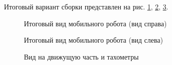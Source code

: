 \documentclass[14pt,a4paper,russian]{scrartcl}
\begin{document}
Итоговый вариант сборки представлен на рис. \ref{fig:robocar_common_sight_right},
\ref{fig:robocar_common_sight_left}, \ref{fig:robocar_common_sight_encoders}.
\begin{figure}[h!]
    \caption{Итоговый вид мобильного робота (вид справа)}
    \label{fig:robocar_common_sight_right}
\end{figure}
\begin{figure}[h!]
    \caption{Итоговый вид мобильного робота (вид слева)}
    \label{fig:robocar_common_sight_left}
\end{figure}
\begin{figure}[h!]
    \caption{Вид на движущую часть и тахометры}
    \label{fig:robocar_common_sight_encoders}
\end{figure}
\end{document}
